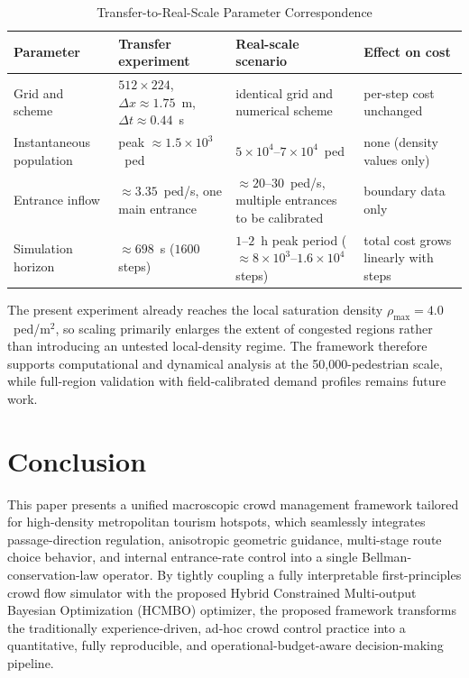 \documentclass[lettersize,journal]{IEEEtran}
\begin{document}
\begin{table}[!t]
\centering
\caption{Transfer-to-Real-Scale Parameter Correspondence}
\label{tab:bund_scale_projection}
\footnotesize
\setlength{\tabcolsep}{6pt}
\begin{tabular}{@{}>{\raggedright\arraybackslash}p{}
>{\raggedright\arraybackslash}p{}
>{\raggedright\arraybackslash}p{}
>{\raggedright\arraybackslash}p{}@{}}
\hline
Parameter & Transfer experiment & Real-scale scenario & Effect on cost \\
\hline
Grid and scheme & $512\times224$, $\Delta x\approx1.75$~m, $\Delta t\approx0.44$~s & identical grid and numerical scheme & per-step cost unchanged \\
Instantaneous population & peak $\approx1.5\times10^3$~ped & $5\times10^4$--$7\times10^4$~ped & none (density values only) \\
Entrance inflow & $\approx3.35$~ped/s, one main entrance & $\approx20$--$30$~ped/s, multiple entrances to be calibrated & boundary data only \\
Simulation horizon & $\approx698$~s ($1600$ steps) & $1$--$2$~h peak period ($\approx8\times10^3$--$1.6\times10^4$ steps) & total cost grows linearly with steps \\
\hline
\end{tabular}
\end{table}

The present experiment already reaches the local saturation density $\rho_{\max}=4.0$~ped/m$^2$, so scaling primarily enlarges the extent of congested regions rather than introducing an untested local-density regime.
The framework therefore supports computational and dynamical analysis at the 50,000-pedestrian scale, while full-region validation with field-calibrated demand profiles remains future work.



\section{Conclusion}
\label{sec:conclusion}

This paper presents a unified macroscopic crowd management framework tailored for high-density metropolitan tourism hotspots, which seamlessly integrates passage-direction regulation, anisotropic geometric guidance, multi-stage route choice behavior, and internal entrance-rate control into a single Bellman-conservation-law operator. By tightly coupling a fully interpretable first-principles crowd flow simulator with the proposed Hybrid Constrained Multi-output Bayesian Optimization (HCMBO) optimizer, the proposed framework transforms the traditionally experience-driven, ad-hoc crowd control practice into a quantitative, fully reproducible, and operational-budget-aware decision-making pipeline.
\end{document}

